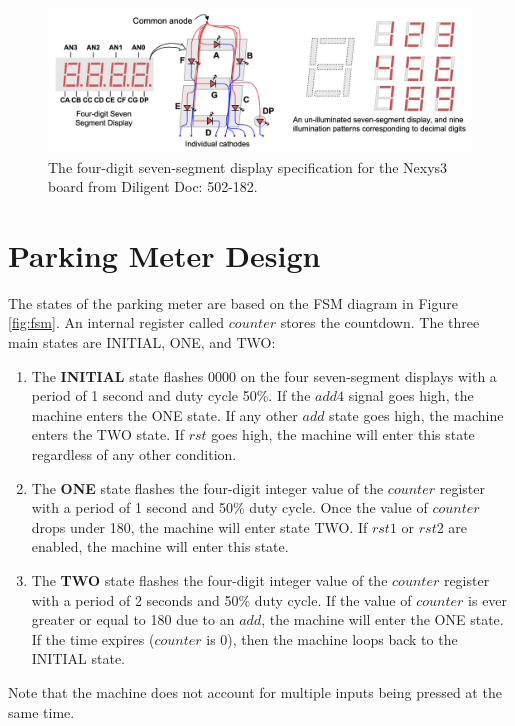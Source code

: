 \documentclass{article}
\begin{document}
\begin{figure}[H]
    \centering
    \includegraphics[scale=0.35]{../figs/four-7-seg.png}
    \caption{The four-digit seven-segment display specification for the Nexys3 board from Diligent Doc: 502-182.}
    \label{fig:four-7-seg}
\end{figure}

\section{Parking Meter Design}
The states of the parking meter are based on the FSM diagram in Figure \ref{fig:fsm}. An internal register called $counter$ stores the countdown. The three main states are INITIAL, ONE, and TWO:
\begin{enumerate}
    \item The \textbf{INITIAL} state flashes 0000 on the four seven-segment displays with a period of 1 second and duty cycle 50\%. If the $add4$ signal goes high, the machine enters the ONE state. If any other $add$ state goes high, the machine enters the TWO state. If $rst$ goes high, the machine will enter this state regardless of any other condition.
    \item The \textbf{ONE} state flashes the four-digit integer value of the $counter$ register with a period of 1 second and 50\% duty cycle. Once the value of $counter$ drops under 180, the machine will enter state TWO. If $rst1$ or $rst2$ are enabled, the machine will enter this state.
    \item The \textbf{TWO} state flashes the four-digit integer value of the $counter$ register with a period of 2 seconds and 50\% duty cycle. If the value of $counter$ is ever greater or equal to 180 due to an $add$, the machine will enter the ONE state. If the time expires ($counter$ is 0), then the machine loops back to the INITIAL state.
\end{enumerate}

Note that the machine does not account for multiple inputs being pressed at the same time.
\end{document}
